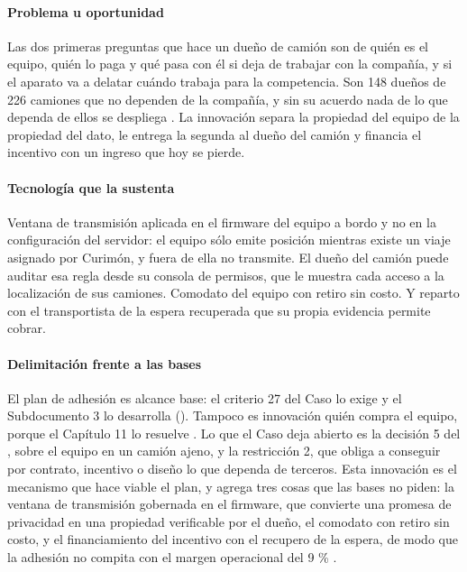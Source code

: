 \paragraph{Problema u oportunidad} Las dos primeras preguntas que hace un dueño de camión son de quién
es el equipo, quién lo paga y qué pasa con él si deja de trabajar con la compañía, y si el aparato va a
delatar cuándo trabaja para la competencia. Son 148 dueños de 226 camiones  que
no dependen de la compañía, y sin su acuerdo nada de lo que dependa de ellos se despliega
. La innovación separa la propiedad del equipo de la propiedad del
dato, le entrega la segunda al dueño del camión y financia el incentivo con un ingreso que hoy se pierde.

\paragraph{Tecnología que la sustenta} Ventana de transmisión aplicada en el firmware del equipo a bordo
y no en la configuración del servidor: el equipo sólo emite posición mientras existe un viaje asignado
por Curimón, y fuera de ella no transmite. El dueño del camión puede auditar esa regla desde su consola
de permisos, que le muestra cada acceso a la localización de sus camiones. Comodato del equipo con
retiro sin costo. Y reparto con el transportista de la espera recuperada que su propia evidencia permite
cobrar.

\paragraph{Delimitación frente a las bases} El plan de adhesión es alcance base: el criterio 27 del Caso
lo exige y el Subdocumento 3 lo desarrolla (). Tampoco es innovación quién
compra el equipo, porque el Capítulo 11 lo resuelve . Lo que el Caso deja abierto
es la decisión 5 del , sobre el equipo en un camión ajeno, y la restricción 2, que
obliga a conseguir por contrato, incentivo o diseño lo que dependa de terceros. Esta innovación es el
mecanismo que hace viable el plan, y agrega tres cosas que las bases no piden: la ventana de transmisión
gobernada en el firmware, que convierte una promesa de privacidad en una propiedad verificable por el
dueño, el comodato con retiro sin costo, y el financiamiento del incentivo con el recupero de la espera,
de modo que la adhesión no compita con el margen operacional del 9 \% .

